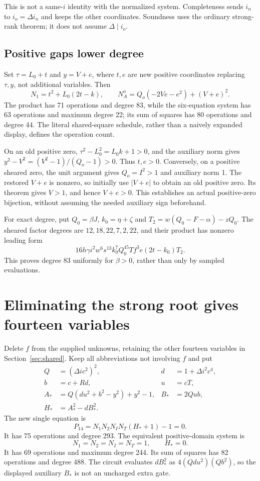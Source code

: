 \documentclass[11pt]{article}
\begin{document}
This is not a same-$i$ identity with the normalized system. Completeness sends
$i_n$ to $i_o=\Delta i_n$ and keeps the other coordinates. Soundness uses the ordinary strong-rank theorem; it does not assume $\Delta\mid i_o$.

\subsection{Positive gaps lower degree}

Set $\tau=L_0+t$ and $y=V+e$, where $t,e$ are new positive coordinates replacing $\tau,y$, not additional variables. Then
\[
N_1=t^2+L_0(2t-k),\qquad
N_A^o=Q_o(-2Ve-e^2)+(V+e)^2.
\]
The product has 71 operations and degree 83, while the six-equation system has 63 operations and maximum degree 22; its sum of squares has 80 operations and degree 44. The literal shared-square schedule, rather than a naively expanded display, defines the operation count.

On an old positive zero, $\tau^2-L_0^2=L_0k+1>0$, and the auxiliary norm gives $y^2-V^2=(V^2-1)/(Q_o-1)>0$. Thus $t,e>0$. Conversely, on a positive sheared zero, the unit argument gives $Q_o=I^2>1$ and auxiliary norm 1. The restored $V+e$ is nonzero, so initially use $|V+e|$ to obtain an old positive zero. Its theorem gives $V>1$, and hence $V+e>0$. This establishes an actual positive-zero bijection, without assuming the needed auxiliary sign beforehand.

For exact degree, put $Q_0=\beta J$, $k_0=\eta+\zeta$ and
$T_2=w(Q_0-F-\alpha)-zQ_0$. The sheared factor degrees are
$12,18,22,7,2,22$, and their product has nonzero leading form
\[
16h\gamma i^2w^6s^{13}k_0^7Q_0^{45}Tf^3e(2t-k_0)T_2.
\]
This proves degree 83 uniformly for $\beta>0$, rather than only by sampled evaluations.

\section{Eliminating the strong root gives fourteen variables}\label{sec:fourteen}

Delete $f$ from the supplied unknowns, retaining the other fourteen variables in Section~\ref{sec:shared}. Keep all abbreviations not involving $f$ and put
\begin{align}
Q&=(\Delta i c^2)^2,&d&=1+\Delta i^2c^4,\\
b&=c+Rd,&u&=cT,\\
A_*&=Q(du^2+b^2-y^2)+y^2-1,&B_*&=2Qub,\\
H_*&=A_*^2-dB_*^2.
\end{align}
The new single equation is
\begin{equation}\label{eq:P14}
\boxed{P_{14}=N_1N_2N_IN_T(H_*+1)-1=0.}
\end{equation}
It has 75 operations and degree 293. The equivalent positive-domain system is
\begin{equation}\label{eq:system14}
\boxed{N_1=N_2=N_I=N_T=1,\qquad H_*=0.}
\end{equation}
It has 69 operations and maximum degree 244. Its sum of squares has 82 operations and degree 488. The circuit evaluates $dB_*^2$ as
$4(Qdu^2)(Qb^2)$, so the displayed auxiliary $B_*$ is not an uncharged extra gate.
\end{document}
